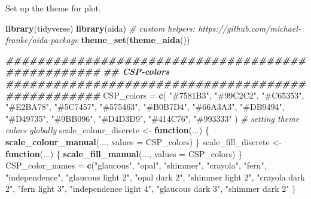 \documentclass[
]{article}
\newenvironment{Shaded}{\begin{snugshade}}{\end{snugshade}}
\newcommand{\AttributeTok}[1]{\textcolor[rgb]{0.13,0.29,0.53}{#1}}
\newcommand{\CommentTok}[1]{\textcolor[rgb]{0.56,0.35,0.01}{\textit{#1}}}
\newcommand{\ControlFlowTok}[1]{\textcolor[rgb]{0.13,0.29,0.53}{\textbf{#1}}}
\newcommand{\DocumentationTok}[1]{\textcolor[rgb]{0.56,0.35,0.01}{\textbf{\textit{#1}}}}
\newcommand{\FunctionTok}[1]{\textcolor[rgb]{0.13,0.29,0.53}{\textbf{#1}}}
\newcommand{\NormalTok}[1]{#1}
\newcommand{\OtherTok}[1]{\textcolor[rgb]{0.56,0.35,0.01}{#1}}
\newcommand{\StringTok}[1]{\textcolor[rgb]{0.31,0.60,0.02}{#1}}
\begin{document}
Set up the theme for plot.

\begin{Shaded}
\begin{Highlighting}[]
\FunctionTok{library}\NormalTok{(tidyverse)}
\FunctionTok{library}\NormalTok{(aida)   }\CommentTok{\# custom helpers: https://github.com/michael{-}franke/aida{-}package}
\FunctionTok{theme\_set}\NormalTok{(}\FunctionTok{theme\_aida}\NormalTok{())}

\DocumentationTok{\#\#\#\#\#\#\#\#\#\#\#\#\#\#\#\#\#\#\#\#\#\#\#\#\#\#\#\#\#\#\#\#\#\#\#\#\#\#\#\#\#\#\#\#\#\#\#\#\#\#}
\DocumentationTok{\#\# CSP{-}colors}
\DocumentationTok{\#\#\#\#\#\#\#\#\#\#\#\#\#\#\#\#\#\#\#\#\#\#\#\#\#\#\#\#\#\#\#\#\#\#\#\#\#\#\#\#\#\#\#\#\#\#\#\#\#\#}
\NormalTok{CSP\_colors }\OtherTok{=} \FunctionTok{c}\NormalTok{(}
  \StringTok{"\#7581B3"}\NormalTok{, }\StringTok{"\#99C2C2"}\NormalTok{, }\StringTok{"\#C65353"}\NormalTok{, }\StringTok{"\#E2BA78"}\NormalTok{, }\StringTok{"\#5C7457"}\NormalTok{, }\StringTok{"\#575463"}\NormalTok{,}
  \StringTok{"\#B0B7D4"}\NormalTok{, }\StringTok{"\#66A3A3"}\NormalTok{, }\StringTok{"\#DB9494"}\NormalTok{, }\StringTok{"\#D49735"}\NormalTok{, }\StringTok{"\#9BB096"}\NormalTok{, }\StringTok{"\#D4D3D9"}\NormalTok{,}
  \StringTok{"\#414C76"}\NormalTok{, }\StringTok{"\#993333"}
\NormalTok{  )}
\CommentTok{\# setting theme colors globally}
\NormalTok{scale\_colour\_discrete }\OtherTok{\textless{}{-}} \ControlFlowTok{function}\NormalTok{(...) \{}
  \FunctionTok{scale\_colour\_manual}\NormalTok{(..., }\AttributeTok{values =}\NormalTok{ CSP\_colors)}
\NormalTok{\}}
\NormalTok{scale\_fill\_discrete }\OtherTok{\textless{}{-}} \ControlFlowTok{function}\NormalTok{(...) \{}
  \FunctionTok{scale\_fill\_manual}\NormalTok{(..., }\AttributeTok{values =}\NormalTok{ CSP\_colors)}
\NormalTok{\}}
\NormalTok{CSP\_color\_names }\OtherTok{=} \FunctionTok{c}\NormalTok{(}\StringTok{"glaucous"}\NormalTok{, }\StringTok{"opal"}\NormalTok{, }\StringTok{"shimmer"}\NormalTok{, }\StringTok{"crayola"}\NormalTok{, }\StringTok{"fern"}\NormalTok{, }\StringTok{"independence"}\NormalTok{,}
           \StringTok{"glaucous light 2"}\NormalTok{, }\StringTok{"opal dark 2"}\NormalTok{, }\StringTok{"shimmer light 2"}\NormalTok{, }\StringTok{"crayola dark 2"}\NormalTok{, }\StringTok{"fern light 3"}\NormalTok{, }\StringTok{"independence light 4"}\NormalTok{,}
           \StringTok{"glaucous dark 3"}\NormalTok{, }\StringTok{"shimmer dark 2"}
\NormalTok{           )}
\end{Highlighting}
\end{Shaded}
\end{document}
